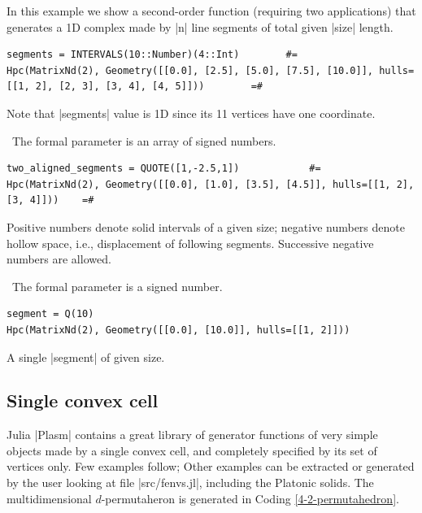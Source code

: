 \begin{coding} In this example we show a second-order function (requiring two applications) that generates a 1D complex made by |n| line segments of total given |size| length.
\begin{lstlisting}[language=JuliaLocal, style=julia, mathescape=true]
segments = INTERVALS(10::Number)(4::Int)		#=
Hpc(MatrixNd(2), Geometry([[0.0], [2.5], [5.0], [7.5], [10.0]], hulls=[[1, 2], [2, 3], [3, 4], [4, 5]]))		=#
\end{lstlisting}
Note that |segments| value is 1D since its 11 vertices have one coordinate. 
\end{coding}


\begin{coding}\
The formal parameter is an array of signed numbers.
\begin{lstlisting}[language=JuliaLocal, style=julia, mathescape=true]
two_aligned_segments = QUOTE([1,-2.5,1])			#=
Hpc(MatrixNd(2), Geometry([[0.0], [1.0], [3.5], [4.5]], hulls=[[1, 2], [3, 4]]))	=#
\end{lstlisting}
Positive numbers denote solid intervals of a given size; negative numbers denote hollow space, i.e., displacement of following segments. Successive negative numbers are allowed.\end{coding}


\begin{coding}\
The formal parameter is a signed number. 
\begin{lstlisting}[language=JuliaLocal, style=julia, mathescape=true]
segment = Q(10)
Hpc(MatrixNd(2), Geometry([[0.0], [10.0]], hulls=[[1, 2]]))
\end{lstlisting}
A single |segment| of given size.
\end{coding}


\subsection*{Single convex cell}\label{sect:5-1-1}

Julia |Plasm| contains a great library of generator functions of very simple objects made by a single convex cell, and completely specified by its set of vertices only. 
Few examples follow; Other examples can be extracted or generated by the user looking at file |src/fenvs.jl|, including the Platonic solids. The multidimensional $d$-permutaheron is generated in Coding \ref{4-2-permutahedron}. 

